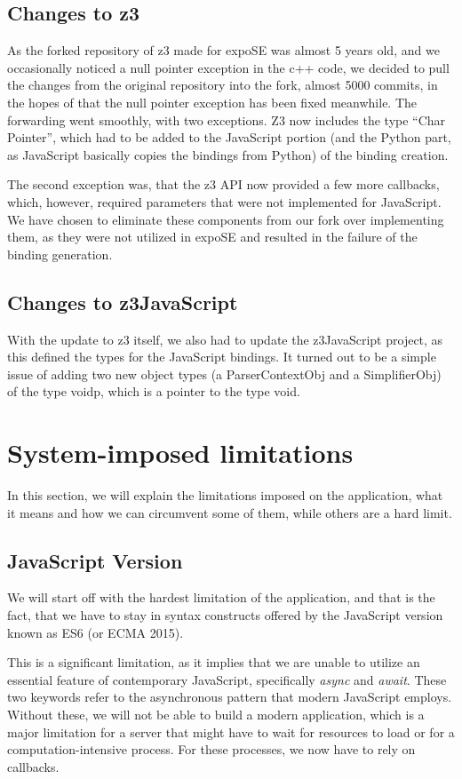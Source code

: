 \subsection{Changes to z3}
\label{sec:changes-z3}
As the forked repository of z3 made for expoSE was almost 5 years old, and we occasionally noticed a null pointer exception in the c++ code, we decided to pull the changes from the original repository into the fork, almost 5000 commits, in the hopes of that the null pointer exception has been fixed meanwhile. 
The forwarding went smoothly, with two exceptions. Z3 now includes the type “Char Pointer”, which had to be added to the JavaScript portion (and the Python part, as JavaScript basically copies the bindings from Python) of the binding creation.

The second exception was, that the z3 API now provided a few more callbacks, which, however, required parameters that were not implemented for JavaScript. We have chosen to eliminate these components from our fork over implementing them, as they were not utilized in expoSE and resulted in the failure of the binding generation.

\subsection{Changes to z3JavaScript}
\label{sec:changes-z3js}
With the update to z3 itself, we also had to update the z3JavaScript project, as this defined the types for the JavaScript bindings. It turned out to be a simple issue of adding two new object types (a ParserContextObj and a SimplifierObj) of the type voidp, which is a pointer to the type void.


\section{System-imposed limitations}
\label{sec:limits}
In this section, we will explain the limitations imposed on the application, what it means and how we can circumvent  some of them, while others are a hard  limit.
\subsection{JavaScript Version}
\label{sec:jsversion}
We will start off with the hardest limitation of the application, and that is the fact, that we have to stay in syntax constructs offered by the JavaScript version known as ES6 (or ECMA 2015).

This is a significant limitation, as it implies that we are unable to utilize an essential feature of contemporary JavaScript, specifically \textit{async} and \textit{await}. These two keywords refer to the asynchronous pattern that modern JavaScript employs. Without these, we will not be able to build a modern application, which is a major limitation for a server that might have to wait for resources to load or for a computation-intensive process. For these processes, we now have to rely on callbacks. 



